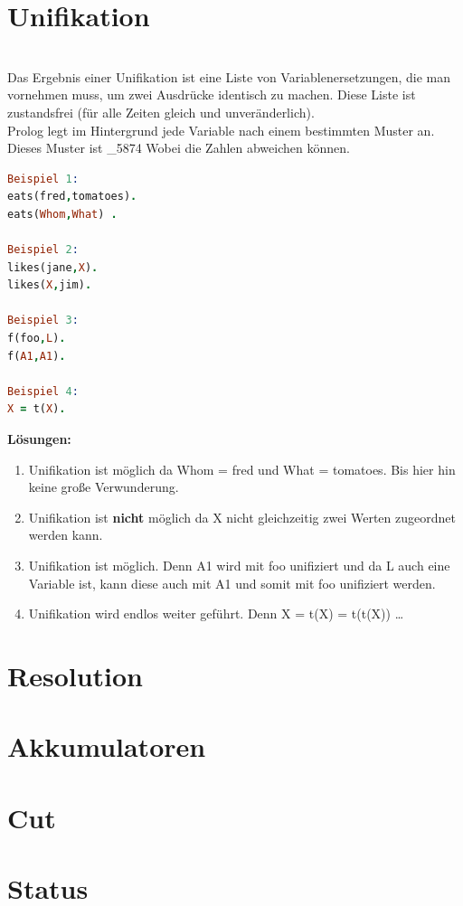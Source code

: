 \section{Unifikation}\label{sec:unifikation}\qquad\\
Das Ergebnis einer Unifikation ist eine Liste von Variablenersetzungen, die man vornehmen muss, um zwei Ausdrücke identisch zu machen. Diese Liste ist zustandsfrei (für alle Zeiten gleich und unveränderlich).\\ Prolog legt im Hintergrund jede Variable nach einem bestimmten Muster an. Dieses Muster ist \_5874 Wobei die Zahlen abweichen können. 
\begin{lstlisting}[language=Prolog] 
Beispiel 1:
eats(fred,tomatoes).
eats(Whom,What) .

Beispiel 2:
likes(jane,X).
likes(X,jim).

Beispiel 3:
f(foo,L).
f(A1,A1).

Beispiel 4:
X = t(X).
\end{lstlisting}
\textbf{Lösungen:}\qquad\\
\begin{enumerate}
	\item Unifikation ist möglich da Whom = fred und What = tomatoes. Bis hier hin keine große Verwunderung.
	\item Unifikation ist \textbf{nicht} möglich da X nicht gleichzeitig zwei Werten zugeordnet werden kann.
	\item Unifikation ist möglich. Denn A1 wird mit foo unifiziert und da L auch eine Variable ist, kann diese auch mit A1 und somit mit foo unifiziert werden. 
	\item Unifikation wird endlos weiter geführt. Denn X = t(X) = t(t(X)) \dots
\end{enumerate}


\section{Resolution}

\section{Akkumulatoren}
\section{Cut}
\section{Status}